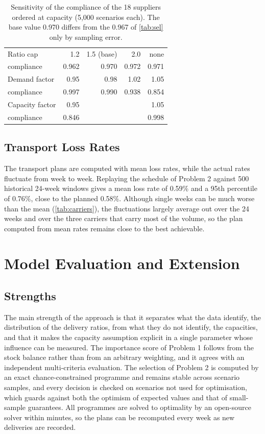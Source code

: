 \documentclass[11pt,a4paper]{article}
\begin{document}
\begin{table}[ht]
\centering
\caption{Sensitivity of the compliance of the 18 suppliers ordered at capacity (5{,}000 scenarios each). The base value 0.970 differs from the 0.967 of \cref{tab:sel} only by sampling error.}\label{tab:sens}
\small
\begin{tabular}{lrrrr}
\toprule
Ratio cap & 1.2 & 1.5 (base) & 2.0 & none \\
compliance & 0.962 & 0.970 & 0.972 & 0.971 \\
\midrule
Demand factor & 0.95 & 0.98 & 1.02 & 1.05 \\
compliance & 0.997 & 0.990 & 0.938 & 0.854 \\
\midrule
Capacity factor & 0.95 & & & 1.05 \\
compliance & 0.846 & & & 0.998 \\
\bottomrule
\end{tabular}
\end{table}

\subsection{Transport Loss Rates}
The transport plans are computed with mean loss rates, while the actual rates fluctuate from week to week.
Replaying the schedule of Problem 2 against 500 historical 24-week windows gives a mean loss rate of 0.59\% and a 95th percentile of 0.76\%, close to the planned 0.58\%.
Although single weeks can be much worse than the mean (\cref{tab:carriers}), the fluctuations largely average out over the 24 weeks and over the three carriers that carry most of the volume, so the plan computed from mean rates remains close to the best achievable.

\section{Model Evaluation and Extension}\label{sec:evaluation}

\subsection{Strengths}
The main strength of the approach is that it separates what the data identify, the distribution of the delivery ratios, from what they do not identify, the capacities, and that it makes the capacity assumption explicit in a single parameter whose influence can be measured.
The importance score of Problem 1 follows from the stock balance rather than from an arbitrary weighting, and it agrees with an independent multi-criteria evaluation.
The selection of Problem 2 is computed by an exact chance-constrained programme and remains stable across scenario samples, and every decision is checked on scenarios not used for optimisation, which guards against both the optimism of expected values and that of small-sample guarantees.
All programmes are solved to optimality by an open-source solver within minutes, so the plans can be recomputed every week as new deliveries are recorded.
\end{document}
